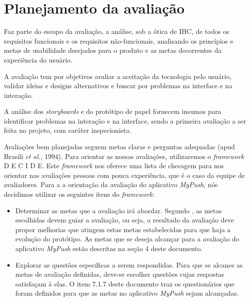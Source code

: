 \chapter{Planejamento da avaliação}

    Faz parte do escopo da avaliação, a análise, sob a ótica de IHC, de todos os requisitos funcionais e os requisitos não-funcionais, 
    analisando os princípios e metas de usabilidade desejados para o produto e as metas decorrentes da experiência do usuário.

    A avaliação tem por objetivos avaliar a aceitação da tecnologia pelo usuário, validar ideias e designs alternativos e buscar 
    por problemas na interface e na interação.
  
    A análise dos \textit{storyboards} e do protótipo de papel fornecem insumos para identificar problemas na interação e na interface,
    sendo a primeira avaliação a ser feita no projeto, com caráter inspecionista.
    
    Avaliações bem planejadas seguem metas claras e perguntas adequadas \cite{preece}(apud Brasili \textit{et al.}, 1994). Para 
    orientar as nossas avaliações, utilizaremos o \textit{framework} D E C I D E. Este \textit{framework} nos oferece uma lista
    de checagem para nos orientar nas avaliações pessoas com pouca experiência, que é o caso da equipe de avaliadores. Para a 
    a orientação da avaliação do aplicativo \textit{MyPush}, nós decidimos utilizar os seguintes itens do \textit{framework}:
    
    \begin{itemize}
       \item Determinar as metas que a avaliação irá abordar.
       \subitem Segundo \cite{preece}, as metas escolhidas devem guiar a avaliação, ou seja, o resultado da avaliação deve propor melhorias 
       que atingem estas metas estabelecidas para que haja a evolução do protótipo. As metas que se deseja alcançar para a avaliação do 
       aplicativo \textit{MyPush} estão descritas na seção 4 deste documento.
    \end{itemize}
    
    \begin{itemize}
    
       \item Explorar as questões específicas a serem respondidas.
       \subitem Para que se alcance as metas de avaliação definidas, deve-se escolher questões cujas respostas satisfaçam à elas. 
       O item 7.1.7 deste documento traz os questionários que foram definidos para que as metas no aplicativo \textit{MyPush} sejam alcançadas.
       
    \end{itemize}
    

